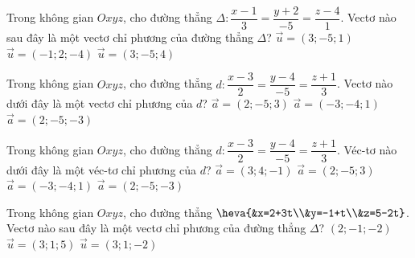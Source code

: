 

\begin{ex}%
	Trong không gian $Oxyz$, cho đường thẳng $\Delta \colon \dfrac{x-1}{3}=\dfrac{y+2}{-5}=\dfrac{z-4}{1}$. Vectơ nào sau đây là  một vectơ chỉ phương của đường thẳng $\Delta$?
		 {\True $\overrightarrow{u}=(3;-5;1)$}
		 {$\overrightarrow{u}=(-1;2;-4)$}
		 {$\overrightarrow{u}=(3;-5;4)$}
\end{ex}

\begin{ex}%
	Trong không gian $Oxyz$, cho đường thẳng $d \colon  \dfrac{x-3}{2}=\dfrac{y-4}{-5}=\dfrac{z+1}{3}$. Vectơ nào dưới đây là một vectơ chỉ phương của $d$?
		 {\True $\overrightarrow{a}=(2;-5;3)$}
		{$\overrightarrow{a}=(-3;-4;1)$} 
		{$\overrightarrow{a}=(2;-5;-3)$} 
\end{ex}

\begin{ex}%
	Trong không gian $Oxyz$, cho đường thẳng $d\colon \dfrac{x-3}{2}=\dfrac{y-4}{-5}=\dfrac{z+1}{3}$. Véc-tơ nào dưới đây là một  véc-tơ chỉ phương của $d$?
	\choice 
		 {$\overrightarrow{a}=(3;4;-1)$}
		 {\True $\overrightarrow{a}=(2;-5;3)$}
		{$\overrightarrow{a}=(-3;-4;1)$} 
		 {$\overrightarrow{a}=(2;-5;-3)$}
\end{ex}

\begin{ex}%
	Trong không gian $Oxyz$, cho đường  thẳng $\heva{&x=2+3t\\&y=-1+t\\&z=5-2t}$. Vectơ nào sau đây là một vectơ chỉ phương của đường thẳng $\Delta$?
		 {$(2;-1;-2)$}
		{$\overrightarrow{u}=(3;1;5)$} 
		 {\True $\overrightarrow{u}=(3;1;-2)$}
\end{ex}

